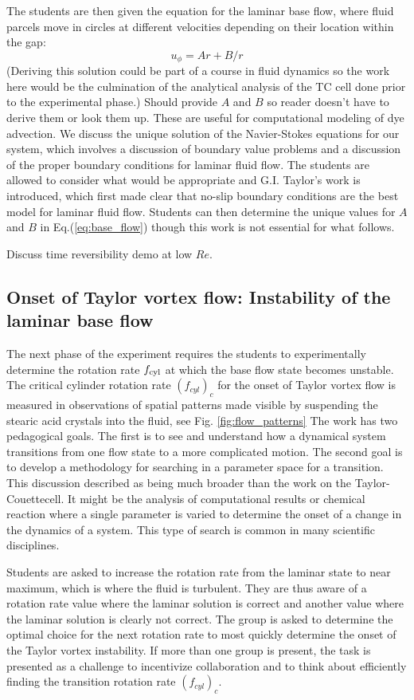 \documentclass[%
reprint,
 amsmath,amssymb,
 aps,
prb,
floatfix,
longbibliography,
notitlepage
]{revtex4-1}
\newcommand{\BE}{\begin{equation}}
\newcommand{\EE}{\end{equation}}
\newcommand{\DB}[1]{{\color{red}#1}} %
\newcommand{\TC}{Taylor-Couette}
\newcommand{\ReN}{\ensuremath{Re}} %
\newcommand{\vel}{\ensuremath{u}}
\begin{document}
The students are then given the equation for the laminar base flow, where fluid parcels move in circles at different velocities depending on their location within the gap: 
\BE
\vel_\phi = Ar + B/r
\label{eq:base_flow}
\EE
(Deriving this solution could be part of a course in fluid dynamics so the work here would be the culmination of the analytical analysis of the TC cell done prior to the experimental phase.) \DB{Should provide $A$ and $B$ so reader doesn't have to derive them or look them up. These are useful for computational modeling of dye advection.} We discuss the unique solution of the Navier-Stokes equations for our system, which involves a discussion of boundary value problems and a discussion of the proper boundary conditions for laminar fluid flow. The students are allowed to consider what would be appropriate and G.I. Taylor's work is introduced, which first made clear that no-slip boundary conditions are the best model for laminar fluid flow. Students can then determine the unique values for $A$ and $B$ in Eq.(\ref{eq:base_flow}) though this work is not essential for what follows. 

\DB{Discuss time reversibility demo at low \ReN.}

\subsection{Onset of Taylor vortex flow: Instability of the laminar base flow}

The next phase of the experiment requires the students to experimentally determine the rotation rate $f_{\rm cyl}$ at which the base flow state becomes unstable. The critical cylinder rotation rate $(f_{cyl})_c$ for the onset of Taylor vortex flow is measured in observations of spatial patterns made visible by suspending the stearic acid crystals into the fluid, see Fig. \ref{fig:flow_patterns}  The work has two pedagogical goals. The first is to see and understand how a dynamical system transitions from one flow state to a more complicated motion. The second goal is to develop a methodology for searching in a parameter space for a transition. This discussion described as being much broader than the work on the \TC cell. It might be the analysis of computational results or chemical reaction where a single parameter is varied to determine the onset of a change in the dynamics of a system. This type of search is common in many scientific disciplines. 

Students are asked to increase the rotation rate from the laminar state to near maximum, which is where the fluid is turbulent. They are thus aware of a rotation rate value where the laminar solution is correct and another value where the laminar solution is clearly not correct. The group is asked to determine the optimal choice for the next rotation rate to most quickly determine the onset of the Taylor vortex instability. If more than one group is present, the task is presented as a challenge to incentivize  collaboration and to think about efficiently finding the transition rotation rate $(f_{cyl})_c$.
\end{document}
